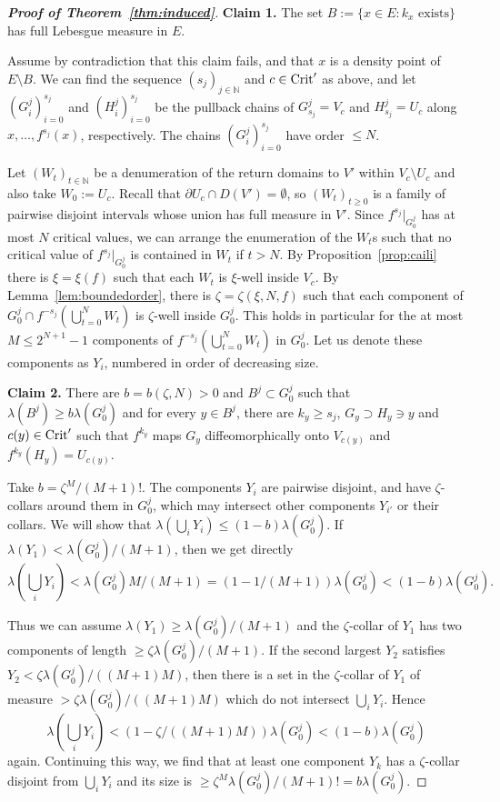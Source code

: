 \documentclass[12pt, psamsfonts, reqno]{amsart}
\begin{document}
\begin{proof}[\textbf{Proof of Theorem~\ref{thm:induced}}]
{\bf Claim 1.} The set $B := \{ x \in E : k_x \text{ exists}\}$
has full Lebesgue measure in $E$.

Assume by contradiction that this claim fails, and that $x$ is a
density point of $E \setminus B$. We can find the sequence
$(s_j)_{j \in {{\mathbb N}}}$ and $c\in {\mathop{\rm Crit}\nolimits}'$  as above, and let
$(G^j_i)_{i=0}^{s_j}$ and $(H^j_i)_{i=0}^{s_j}$ be the pullback
chains of $G^j_{s_j} = V_c$ and $H^j_{s_j} = U_c$ along $x, \dots,
f^{s_j}(x)$, respectively. The chains $(G^j_i)_{i=0}^{s_j}$ have
order $\leq N$.

Let $(W_t)_{t \in {{\mathbb N}}}$ be a denumeration of the return domains to
$V'$ within $V_c \setminus U_c$ and also take $W_0 := U_c$. Recall
that $\partial U_c\cap D(V')=\emptyset$, so $(W_t)_{t \geq 0}$ is
a family of pairwise disjoint intervals whose union has full
measure in $V'$. Since $f^{s_j}|_{G^j_0}$ has at most $N$ critical
values, we can arrange the enumeration of the $W_t$s such that no
critical value of $f^{s_j}|_{G^j_0}$ is contained in $W_t$ if
$t>N$. By Proposition~\ref{prop:caili} there is $\xi=\xi(f)$
such that each $W_t$ is $\xi$-well inside $V_c$. By
Lemma~\ref{lem:boundedorder}, there is $\zeta=\zeta(\xi,N,f)$ such
that each component of $G^j_0 \cap f^{-s_j}(\bigcup_{t=0}^{N}
W_t)$ is $\zeta$-well inside $G^j_0$. This holds in particular for
the at most $M \leq 2^{N+1}-1$ components of
$f^{-s_j}(\bigcup_{t=0}^N W_t)$ in $G^j_0$. Let us denote these
components as $Y_i$, numbered in order of decreasing size.

{\bf Claim 2.} There are $b = b(\zeta, N) > 0$ and $B^j \subset
G^j_0$ such that $\lambda(B^j) \geq b \lambda(G^j_0)$ and for
every $y \in B^j$, there are $k_y \geq s_j$, $G_y \supset H_y
\owns y$ and $c(y) \in {\mathop{\rm Crit}\nolimits}'$ such that $f^{k_y}$ maps $G_y$
diffeomorphically onto $V_{c(y)}$ and $f^{k_y}(H_y) = U_{c(y)}$.

Take $b = \zeta^M /(M+1)!$. The components $Y_i$ are pairwise
disjoint, and have $\zeta$-collars around them in $G^j_0$, which
may intersect other components $Y_{i'}$ or their collars. We will
show that $\lambda(\bigcup_i Y_i) \leq (1-b)\lambda(G^j_0)$. If
$\lambda(Y_1) <\lambda(G^j_0)/(M + 1)$, then we get directly
$$\lambda(\bigcup_i Y_i)<\lambda(G^j_0) M /(M +
1)=(1-1/(M+1))\lambda(G^j_0)<(1-b)\lambda(G^j_0).$$

Thus we can assume $\lambda(Y_1) \geq \lambda(G^j_0)/(M +1)$ and
the $\zeta$-collar of $Y_1$ has two components of length $\geq
\zeta \lambda(G^j_0)/(M+1)$. If the second largest $Y_2$ satisfies
$Y_2 <\zeta \lambda(G^j_0)/((M+1)M)$, then there is a set  in the
$\zeta$-collar of $Y_1$ of measure $>\zeta
\lambda(G^j_0)/((M+1)M)$ which do not intersect $\bigcup_i Y_i$.
Hence
$$\lambda(\bigcup_i Y_i)<(1-\zeta/((M+1)M))\lambda(G^j_0)<(1-b)\lambda(G^j_0)
$$
again. Continuing this way, we find that at least one component
$Y_k$ has a $\zeta$-collar disjoint from $\bigcup_i Y_i$ and its
size is $\geq  \zeta^{M} \lambda(G^j_0)/(M+1)! = b
\lambda(G_0^j)$.


\end{proof}
\end{document}
